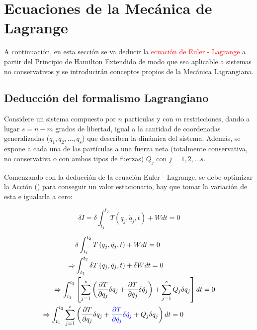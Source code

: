 \documentclass[/home/hernan-barquero/Documents/Apuntes_mecanica_teorica/main.tex]{subfiles}
\begin{document}
    \section{Ecuaciones de la Mecánica de Lagrange}

    A continuación, en esta sección se va deducir la \textcolor{red}{ecuación de Euler - Lagrange}  a partir del Principio de Hamilton Extendido de modo que sea aplicable a sistemas no conservativos y se introducirán conceptos propios de la Mecánica Lagrangiana. \\ 

    \subsection{Deducción del formalismo Lagrangiano}

    Considere un sistema compuesto por $n$ partículas y con $m$ restricciones, dando a lugar $s = n-m$ grados de libertad, igual a la cantidad de coordenadas generalizadas ($q_{1},q_{2},...,q_{s}$) que describen la dinámica del sistema. Además, se expone a cada una de las partículas a una fuerza neta (totalmente conservativa, no conservativa o con ambos tipos de fuerzas) $Q_{j}$ con $j=1,2,...s$.

    Comenzando con la deducción de la ecuación Euler - Lagrange, se debe optimizar la Acción () para conseguir un valor estacionario, hay que tomar la variación de esta e igualarla a cero:
    
    \begin{equation*}
        \delta I = \delta \int_{t_1}^{t_2} T\left(q_{j}, \dot{q}_{j}, t\right) + W dt = 0 
    \end{equation*}

    \begin{align*}
        & \delta \int_{t_1}^{t_2} T\left(q_{j}, \dot{q}_{j}, t\right) + W dt = 0 \\ 
        \Rightarrow & \int_{t_1}^{t_2} \delta T\left(q_{j}, \dot{q}_{j}, t\right) + \delta  W dt = 0 \\ 
        \Rightarrow  \int_{t_1}^{t_2}  & \left[  \sum_{j=1}^{s} \left( \frac{\partial T}{\partial q_{j}}   \delta q_{j} +\frac{\partial T}{\partial \dot{q}_{j}} \delta \dot{q}_{j}  \right) + \sum_{j=1}^{s} Q_{j} \delta q_{j}  \right] dt = 0 \\ 
        \Rightarrow \int_{t_1}^{t_2} \sum_{j=1}^{s} & \left(\frac{\partial T}{\partial q_{j}} \delta q_{j} + \textcolor{blue}{\frac{\partial T}{\partial \dot{q}_{j}} \delta \dot{q}_{j}}   + Q_{j} \delta q_{j} \right) dt = 0 \\ 
    \end{align*}
\end{document}
